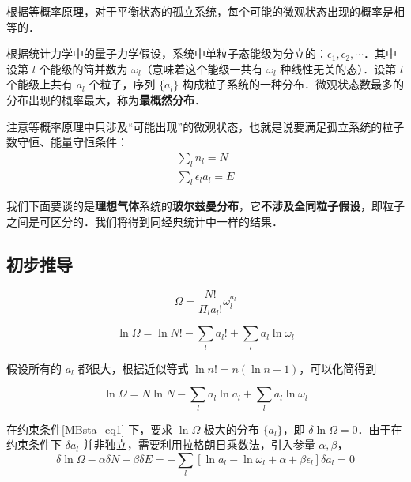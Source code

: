 

根据等概率原理，对于平衡状态的孤立系统，每个可能的微观状态出现的概率是相等的．

根据统计力学中的量子力学假设，系统中单粒子态能级为分立的：$\epsilon_1,\epsilon_2,\cdots$．其中设第 $l$ 个能级的简并数为 $\omega_l$（意味着这个能级一共有 $\omega_l$ 种线性无关的态）．设第 $l$ 个能级上共有 $a_l$ 个粒子，序列 $\{a_l\}$ 构成粒子系统的一种分布．微观状态数最多的分布出现的概率最大，称为\textbf{最概然分布}．

注意等概率原理中只涉及“可能出现”的微观状态，也就是说要满足孤立系统的粒子数守恒、能量守恒条件：
\begin{equation}\label{MBsta_eq1}
\begin{aligned}
\sum_l n_l=N\\
\sum_l \epsilon_l a_l=E
\end{aligned}
\end{equation}

我们下面要谈的是\textbf{理想气体}系统的\textbf{玻尔兹曼分布}，它\textbf{不涉及全同粒子假设}，即粒子之间是可区分的．我们将得到同经典统计中一样的结果．

\subsection{初步推导}
\begin{equation}
\Omega=\frac{N!}{\Pi_l a_l!}\omega_l^{a_l}
\end{equation}

\begin{equation}
\ln \Omega=\ln N!-\sum_{l}a_l!+\sum_l a_l\ln \omega_l
\end{equation}

假设所有的 $a_l$ 都很大，根据近似等式 $\ln n! = n(\ln n-1)$，可以化简得到

\begin{equation}
\ln \Omega=N\ln N-\sum_l a_l\ln a_l+\sum_l a_l\ln \omega_l
\end{equation}

在约束条件\autoref{MBsta_eq1} 下，要求 $\ln \Omega$ 极大的分布 $\{a_l\}$，即 $\delta \ln \Omega =0$．由于在约束条件下 $\delta a_l$ 并非独立，需要利用拉格朗日乘数法，引入参量 $\alpha,\beta$，
\begin{equation}
\delta \ln \Omega -\alpha \delta N-\beta \delta E=-\sum_l [\ln a_l-\ln \omega_l+\alpha +\beta\epsilon_l]\delta a_l=0
\end{equation}

